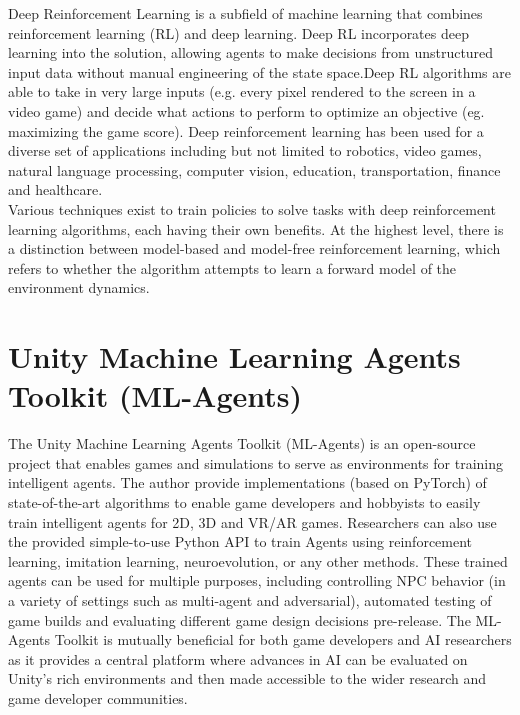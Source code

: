 \documentclass[12pt,a4paper,oneside]{book}
\theoremstyle{plain}
\numberwithin{equation}{chapter} \DeclareMathOperator{\Var}{Var}
\begin{document}
Deep Reinforcement Learning is a subfield of machine learning that combines reinforcement learning (RL) and deep learning. Deep RL incorporates deep learning into the solution, allowing agents to make decisions from unstructured input data without manual engineering of the state space.Deep RL algorithms are able to take in very large inputs (e.g. every pixel rendered to the screen in a video game) and decide what actions to perform to optimize an objective (eg. maximizing the game score). Deep reinforcement learning has been used for a diverse set of applications including but not limited to robotics, video games, natural language processing, computer vision, education, transportation, finance and healthcare. \\
Various techniques exist to train policies to solve tasks with deep reinforcement learning algorithms, each having their own benefits. At the highest level, there is a distinction between model-based and model-free reinforcement learning, which refers to whether the algorithm attempts to learn a forward model of the environment dynamics.





\section{Unity Machine Learning Agents Toolkit (ML-Agents)}\label{Sec2.2}
The Unity Machine Learning Agents Toolkit (ML-Agents) is an open-source project that enables games and simulations to serve as environments for training intelligent agents. The author provide implementations (based on PyTorch) of state-of-the-art algorithms to enable game developers and hobbyists to easily train intelligent agents for 2D, 3D and VR/AR games. Researchers can also use the provided simple-to-use Python API to train Agents using reinforcement learning, imitation learning, neuroevolution, or any other methods. These trained agents can be used for multiple purposes, including controlling NPC behavior (in a variety of settings such as multi-agent and adversarial), automated testing of game builds and evaluating different game design decisions pre-release. The ML-Agents Toolkit is mutually beneficial for both game developers and AI researchers as it provides a central platform where advances in AI can be evaluated on Unity’s rich environments and then made accessible to the wider research and game developer communities.
\end{document}
